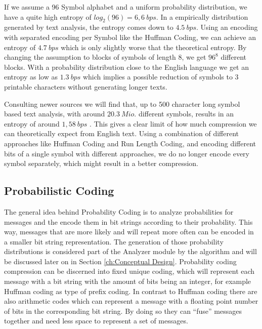 \par {
If we assume a 96 Symbol alphabet and a uniform probability distribution, we have a quite high entropy of $log_2 (96) = 6,6 \: bps$. In a empirically distribution generated by text analysis, the entropy comes down to $4.5 \: bps$. Using an encoding with separated encoding per Symbol like the Huffman Coding, we can achieve an entropy of $4.7 \: bps$ which is only slightly worse that the theoretical entropy. By changing the assumption to blocks of symbols of length 8, we get $96^8$ different blocks. With a probability distribution close to the English language we get an entropy as low as $1.3 \: bps$ which implies a possible reduction of symbols to 3 printable characters without generating longer texts.}

\par{
Consulting newer sources we will find that, up to 500 character long symbol based text analysis, with around $20.3 \: Mio.$ different symbols, results in an entropy of around $1,58 \: bps$ \cite{entropy-new}. This gives a clear limit of how much compression we can theoretically expect from English text.  Using a combination of different approaches like Huffman Coding and Run Length Coding, and encoding different bits of a single symbol with different approaches, we do no longer encode every symbol separately, which might result in a better compression.}


\subsection{Probabilistic Coding}
\par{
The general idea behind Probability Coding is to analyze probabilities for messages and the encode them in bit strings according to their probability. This way, messages that are more likely and will repeat more often can be encoded in a smaller bit string representation. The generation of those probability distributions is considered part of the Analyzer module by the algorithm and will be discussed later on in Section \ref{ch:Conceptual Design}. Probability coding compression can be discerned into fixed unique coding, which will represent each message with a bit string with the amount of bits being an integer, for example Huffman coding as type of prefix coding. In contrast to Huffman coding there are also arithmetic codes which can represent a message with a floating point number of bits in the corresponding bit string. By doing so they can \enquote{fuse} messages together and need less space to represent a set of messages.
}

